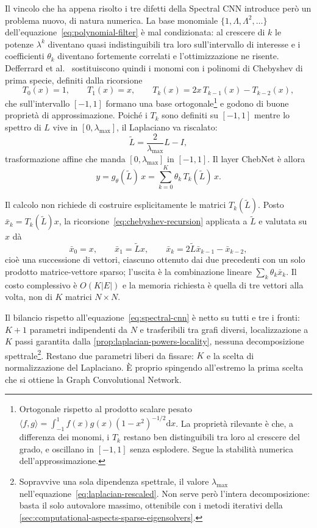 Il vincolo che ha appena risolto i tre difetti della Spectral CNN introduce però un problema nuovo, di natura numerica. La base monomiale $\{1,\Lambda,\Lambda^2,\dots\}$ dell'equazione~\eqref{eq:polynomial-filter} è mal condizionata: al crescere di $k$ le potenze $\lambda^k$ diventano quasi indistinguibili tra loro sull'intervallo di interesse e i coefficienti $\theta_k$ diventano fortemente correlati e l'ottimizzazione ne risente. Defferrard et al.~\cite{defferrard2016chebnet} sostituiscono quindi i monomi con i polinomi di Chebyshev di prima specie, definiti dalla ricorsione
\begin{equation}
\label{eq:chebyshev-recursion}
T_0(x)=1,\qquad T_1(x)=x,\qquad T_k(x)=2x\,T_{k-1}(x)-T_{k-2}(x),
\end{equation}
che sull'intervallo $[-1,1]$ formano una base ortogonale\footnote{Ortogonale rispetto al prodotto scalare pesato $\langle f,g\rangle=\int_{-1}^{1}f(x)g(x)(1-x^2)^{-1/2}\mathrm{d}x$. La proprietà rilevante è che, a differenza dei monomi, i $T_k$ restano ben distinguibili tra loro al crescere del grado, e oscillano in $[-1,1]$ senza esplodere. Segue la stabilità numerica dell'approssimazione.} e godono di buone proprietà di approssimazione. Poiché i $T_k$ sono definiti su $[-1,1]$ mentre lo spettro di $L$ vive in $[0,\lambda_{\max}]$, il Laplaciano va riscalato:
\begin{equation}
\label{eq:laplacian-rescaled}
\tilde L = \frac{2}{\lambda_{\max}}L - I,
\end{equation}
trasformazione affine che manda $[0,\lambda_{\max}]$ in $[-1,1]$. Il layer ChebNet è allora
\begin{equation}
\label{eq:chebnet}
y = g_\theta(\tilde L)\,x = \sum_{k=0}^{K}\theta_k\,T_k(\tilde L)\,x .
\end{equation}

Il calcolo non richiede di costruire esplicitamente le matrici $T_k(\tilde L)$. Posto $\bar x_k = T_k(\tilde L)x$, la ricorsione~\eqref{eq:chebyshev-recursion} applicata a $\tilde L$ e valutata su $x$ dà
$$\bar x_0 = x,\qquad \bar x_1 = \tilde Lx,\qquad \bar x_k = 2\tilde L\bar x_{k-1}-\bar x_{k-2},$$
cioè una successione di vettori, ciascuno ottenuto dai due precedenti con un solo prodotto matrice-vettore sparso; l'uscita è la combinazione lineare $\sum_k\theta_k\bar x_k$. Il costo complessivo è $O(K|E|)$ e la memoria richiesta è quella di tre vettori alla volta, non di $K$ matrici $N\times N$.

Il bilancio rispetto all'equazione~\eqref{eq:spectral-cnn} è netto su tutti e tre i fronti: $K+1$ parametri indipendenti da $N$ e trasferibili tra grafi diversi, localizzazione a $K$ passi garantita dalla \cref{prop:laplacian-powers-locality}, nessuna decomposizione spettrale\footnote{Sopravvive una sola dipendenza spettrale, il valore $\lambda_{\max}$ nell'equazione~\eqref{eq:laplacian-rescaled}. Non serve però l'intera decomposizione: basta il solo autovalore massimo, ottenibile con i metodi iterativi della \cref{sec:computational-aspects-sparse-eigensolvers}.}. Restano due parametri liberi da fissare: $K$ e la scelta di normalizzazione del Laplaciano. È proprio spingendo all'estremo la prima scelta che si ottiene la Graph Convolutional Network.

